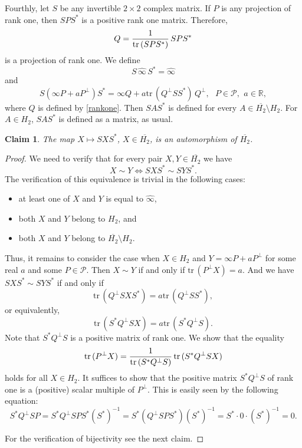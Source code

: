 \documentclass[10pt,a4paper]{amsart}
\providecommand{\index}[1]{}
\newcommand\oH{{\overline{H_2}}}
\newcommand\oi{{\widehat{\infty}}}
\newtheorem{claim}[theorem]{Claim}
\theoremstyle{definition}
\theoremstyle{remark}
\numberwithin{subsection}{section}
\numberwithin{equation}{section}
\begin{document}
Fourthly, let $S$ be any invertible $2 \times 2$ complex matrix. If $P$ is any projection of rank one, then $SPS^\ast$ is a positive rank one matrix.
Therefore,
\begin{equation}\label{rankone}
Q= {1 \over \mathrm{tr}\, (SPS^\ast)  } \, SPS^\ast 
\end{equation}
is a projection of rank one. We define
\[
S\,  {\oi}\,  S^\ast = {\oi}
\]
and
\[
S ( \infty P + aP^{\perp})S^\ast =  \infty Q +   a \mathrm{tr}\, (Q^\perp SS^\ast) \, Q^{\perp}  , \ \ \ P\in \mathcal{P}, \ \, a \in \mathbb{R},
\]
where $Q$ is defined by \eqref{rankone}.  
Then $SAS^*$ \index{$SAS^*$} is defined for every $A\in \oH\setminus H_2$.
For $A\in H_2$, $SAS^*$ is defined as a matrix, as usual.
\begin{claim}\label{sas*}
The map $X \mapsto SXS^\ast $, $X \in \oH$, is an automorphism of $\oH$. 
\end{claim}
\begin{proof}
We need to verify that for every pair $X,Y \in \oH$ we have
\begin{equation}\label{sxs}
X \sim Y \iff SXS^\ast \sim SYS^\ast.
\end{equation}
The verification of this equivalence is trivial in the following cases:
\begin{itemize}
\item at least one of $X$ and $Y$ is equal to ${\oi}$,
\item both $X$ and $Y$ belong to $H_2$, and
\item both $X$ and $Y$ belong to $\oH\setminus H_2$.
\end{itemize}
Thus, it remains to consider the case when 
$X \in H_2$ and $Y =  \infty P + aP^{\perp}$ for some real $a$ and some $P \in \mathcal{P}$. Then $X \sim Y$ if and only if $\mathrm{tr}\, (P^\perp X) = a$. And we have $SXS^\ast \sim SYS^\ast$ if and only if
\[
\mathrm{tr}\, (Q^\perp SXS^\ast) = a \mathrm{tr}\, (Q^\perp SS^\ast),
\]
or equivalently, 
\[
\mathrm{tr}\, (S^\ast Q^\perp SX) = a \mathrm{tr}\, (S^\ast Q^\perp S).
\]
Note that $S^\ast Q^\perp S$ is a positive matrix of rank one. 
We show that the equality
\[
\mathrm{tr}\, (P^\perp X)={1 \over \mathrm{tr}\, (S^\ast Q^\perp S ) } \, 
\mathrm{tr}\, (S^\ast Q^\perp SX)
\]
holds for all $X\in H_2$. 
It suffices to show that the positive matrix $S^\ast Q^\perp S$ of rank one is a (positive) scalar multiple of $P^\perp$. 
This is easily seen by the following equation: 
\[
S^\ast Q^\perp SP = S^\ast Q^\perp SP S^\ast (S^\ast)^{-1} =  S^\ast  (Q^\perp SP S^\ast) (S^\ast)^{-1} = S^\ast \cdot 0\cdot (S^\ast)^{-1} =0.
\]

For the verification of bijectivity see the next claim.
\end{proof}
\end{document}
